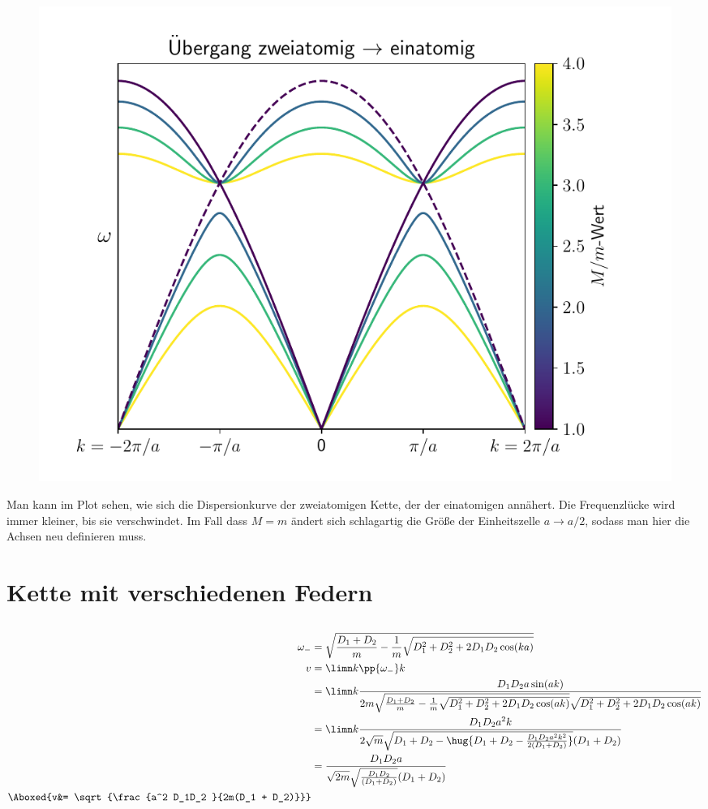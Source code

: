 \documentclass[exa]{exercise_5.0}
\begin{document}
\subsection{}
\begin{figure}[H]
    \centering
    \includegraphics[width=.9\textwidth]{transition.pdf}
\end{figure}
Man kann im Plot sehen, wie sich die Dispersionkurve der zweiatomigen Kette, der der einatomigen annähert. Die Frequenzlücke wird immer kleiner, bis sie verschwindet. Im Fall dass $M=m$ ändert sich schlagartig die Größe der Einheitszelle $a\to a/2$, sodass man hier die Achsen neu definieren muss.

\section{Kette mit verschiedenen Federn}
\subsection{}
\begin{align*}
    \omega_- &=\sqrt{ \frac{D_1+D_2}{m} - \frac1{m}\sqrt{D_1^2 + D_2^2 + 2D_1D_2 \cos(ka)}}\\
   v &= \limn k\pp{\omega_-}k \\
   &= \limn k\frac{D_1D_2 a \sin(ak)}{2m \sqrt{\frac{D_1 +D_2}{m} - \frac1m \sqrt{D_1^2 + D_2 ^2 + 2 D_1 D_2 \cos(ak)}} \sqrt{D_1^2 + D_2^2 + 2D_1 D_2 \cos(ak)}}  \\  
   &= \limn k\frac{D_1D_2 a^2 k}{2\sqrt m \sqrt{D_1 +D_2 - \hug{D_1 + D_2 - \frac{D_1 D_2 a^2 k^2}{2(D_1 + D_2)}} } (D_1 + D_2)}  \\  
   &= \frac{D_1D_2 a}{\sqrt {2m}\sqrt{\frac{D_1 D_2}{(D_1 + D_2)} } (D_1 + D_2)}  \\  
   \Aboxed{v&= \sqrt{\frac{a^2 D_1D_2 }{2m(D_1 + D_2)}}}  
\end{align*}
\end{document}
